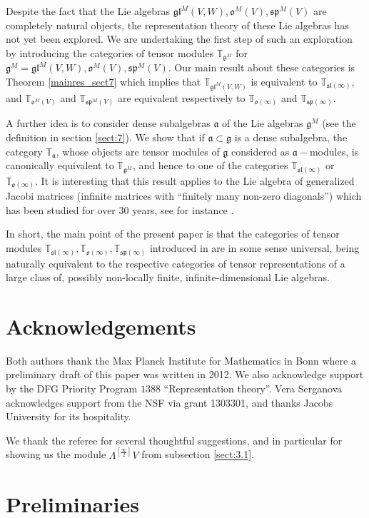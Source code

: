 \documentclass{svmult}
\newcommand{\TT}{\mathbb{T}}
\renewcommand{\sp}{\mathfrak{sp}}
\renewcommand{\sl}{\mathfrak{sl}}
\newcommand{\oo}{\mathfrak{o}}
\renewcommand{\aa}{\mathfrak{a}}
\renewcommand{\gg}{\mathfrak{g}}
\newcommand{\gl}{\mathfrak{gl}}
\begin{document}
Despite the fact that the Lie algebras $\gl^M(V,W), \oo^M(V),
\sp^M(V)$ are completely natural objects, the representation theory of
these Lie algebras has not yet been explored. We are undertaking the
first step of such an exploration by introducing the categories of
tensor modules $\TT_{\gg^M}$ for $\gg^M = \gl^M(V,W),
\oo^M(V),\sp^M(V)$. Our main result about these categories is 
Theorem \ref{mainres_sect7}
which implies that $\TT_{\gl^M(V,W)}$ is equivalent to
$\TT_{\sl(\infty)}$, and $\TT_{\oo^M(V)}$ and 
$\TT_{\sp^M(V)}$ are equivalent respectively to $\TT_{\oo(\infty)}$ and $\TT_{\sp(\infty)}$.

A further idea is to  consider dense subalgebras $\aa$ of the Lie algebras $\gg^M$ (see the definition in section \ref{sect:7}). We show that if $\aa \subset \gg$ is a dense subalgebra, the category $\TT_\aa$, whose objects are tensor modules of $\gg$ considered as $\aa-$modules, is canonically equivalent to $\TT_{\gg^M}$, and hence to one of the categories $\TT_{\sl(\infty)}$ or $\TT_{\oo(\infty)}$. It is interesting that this result applies to the Lie algebra of generalized Jacobi matrices (infinite matrices with ``finitely many non-zero diagonals'') which has been studied for over 30 years, see for instance \cite{FT}.

In short, the main point of the present paper is that the categories of tensor modules $\TT_{\sl(\infty)}, \TT_{\oo(\infty)}, \TT_{\sp(\infty)}$ introduced in \cite{DPS} are in some sense universal, being naturally equivalent to the respective categories of tensor representations of a large class of, possibly non-locally finite, infinite-dimensional Lie algebras.

\section*{Acknowledgements}\label{sect:acknow.}
Both authors thank the Max Planck Institute for Mathematics in Bonn where a preliminary draft of this paper was written in 2012. We also acknowledge support by the DFG Priority Program $1388$ ``Representation theory''. Vera Serganova acknowledges support from the NSF via grant 1303301, and thanks Jacobs University for its hospitality.

We thank the referee for several thoughtful suggestions, and in particular for showing us the module $\Lambda^{[\frac{\infty}{2}]}V$ from subsection \ref{sect:3.1}.

\section{Preliminaries}\label{sect:1}
\end{document}
